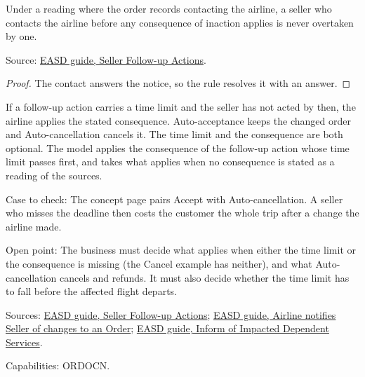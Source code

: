 \begin{theorem}
  \label{thm:airline-change-contact-recorded}
  Under a reading where the order records contacting the airline, a seller
  who contacts the airline before any consequence of inaction applies is
  never overtaken by one.

  Source: \href{https://standards.atlassian.net/wiki/spaces/EASD/pages/574849094}{EASD guide, Seller Follow-up Actions}.
\end{theorem}
\begin{proof}
  The contact answers the notice, so the rule resolves it with an answer.
\end{proof}

\begin{definition}
  \label{def:airline-change-inaction-consequence}
  If a follow-up action carries a time limit and the seller has not acted by
  then, the airline applies the stated consequence. Auto-acceptance keeps
  the changed order and Auto-cancellation cancels it. The time limit and the
  consequence are both optional.  The model applies the consequence of the
  follow-up action whose time limit passes first, and takes what applies
  when no consequence is stated as a reading of the sources.

  Case to check: The concept page pairs Accept with Auto-cancellation. A
  seller who misses the deadline then costs the customer the whole trip
  after a change the airline made.

  Open point: The business must decide what applies when either the time
  limit or the consequence is missing (the Cancel example has neither), and
  what Auto-cancellation cancels and refunds. It must also decide whether
  the time limit has to fall before the affected flight departs.

  Sources: \href{https://standards.atlassian.net/wiki/spaces/EASD/pages/574849094}{EASD guide, Seller Follow-up Actions};
  \href{https://standards.atlassian.net/wiki/spaces/EASD/pages/815202352}{EASD guide, Airline notifies Seller of changes to an Order};
  \href{https://standards.atlassian.net/wiki/spaces/EASD/pages/672825400}{EASD guide, Inform of Impacted Dependent Services}.

  Capabilities: ORDOCN.
\end{definition}

